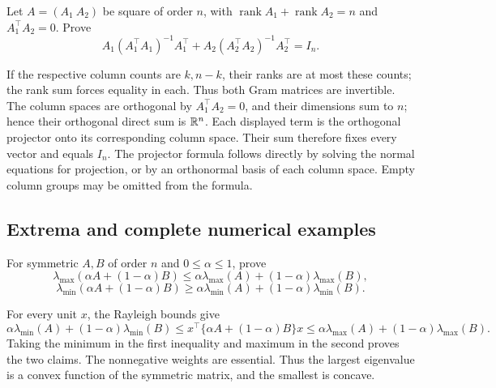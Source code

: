 \begin{problem}\label{ex:09:complementary}
Let \(A=(A_1\ A_2)\) be square of order \(n\), with
\(\operatorname{rank}A_1+\operatorname{rank}A_2=n\) and
\(A_1^\top A_2=0\). Prove
\[
 A_1(A_1^\top A_1)^{-1}A_1^\top
 +A_2(A_2^\top A_2)^{-1}A_2^\top=I_n.
\]
\end{problem}
\begin{solution}
If the respective column counts are \(k,n-k\), their ranks are at most
these counts; the rank sum forces equality in each. Thus both Gram
matrices are invertible.
The column spaces are orthogonal by \(A_1^\top A_2=0\), and their
dimensions sum to \(n\); hence their orthogonal direct sum is \(\mathbb R^n\).
Each displayed term is the orthogonal projector onto its corresponding
column space. Their sum therefore fixes every vector and equals \(I_n\).
The projector formula follows directly by solving the normal equations
for projection, or by an orthonormal basis of each column space.
Empty column groups may be omitted from the formula.
\end{solution}

\subsection*{Extrema and complete numerical examples}

\begin{problem}\label{ex:09:eigen-convexity}
For symmetric \(A,B\) of order \(n\) and \(0\leqslant\alpha\leqslant1\),
prove
\[
 \lambda_{\max}(\alpha A+(1-\alpha)B)
 \leqslant\alpha\lambda_{\max}(A)+(1-\alpha)\lambda_{\max}(B),
\]
\[
 \lambda_{\min}(\alpha A+(1-\alpha)B)
 \geqslant\alpha\lambda_{\min}(A)+(1-\alpha)\lambda_{\min}(B).
\]
\end{problem}
\begin{solution}
For every unit \(x\), the Rayleigh bounds give
\[
 \alpha\lambda_{\min}(A)+(1-\alpha)\lambda_{\min}(B)
 \leqslant x^\top\{\alpha A+(1-\alpha)B\}x
 \leqslant\alpha\lambda_{\max}(A)+(1-\alpha)\lambda_{\max}(B).
\]
Taking the minimum in the first inequality and maximum in the second
proves the two claims. The nonnegative weights are essential.
Thus the largest eigenvalue is a convex function of the symmetric
matrix, and the smallest is concave.
\end{solution}

